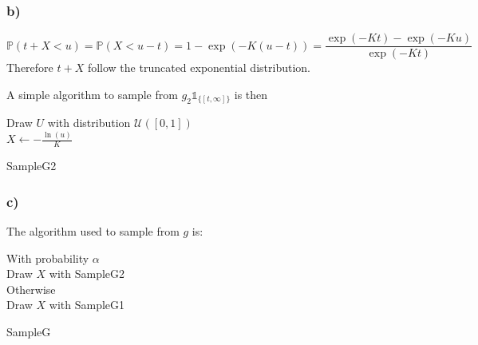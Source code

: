\subsubsection*{b)}

\[\mathbb{P}(t + X < u) = \mathbb{P}(X < u-t) = 1 - \exp(-K(u-t)) = \frac{\exp(-Kt) - \exp(-Ku)}{\exp(-Kt)}\]
Therefore $t + X$ follow the truncated exponential distribution.


A simple algorithm to sample from $g_2\mathbb{1}_{\{[t,\infty]\}}$ is then 

\begin{algorithm}[H]
	Draw $U$ with distribution $\mathcal{U}([0,1])$\\
	$X \leftarrow -\frac{\ln(u)}{K}$\\ 
	\caption{SampleG2}
\end{algorithm}
\subsubsection*{c)}

The algorithm used to sample from $g$ is:

\begin{algorithm}[H]
	With probability $\alpha$\\
	Draw $X$ with SampleG2\\
	Otherwise\\
	Draw $X$ with SampleG1\\
	\caption{SampleG}
\end{algorithm}


